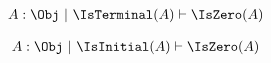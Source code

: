 \begin{sequent}
\begin{align*}
 A:\Obj ~|~ \IsTerminal( A ) \vdash \IsZero( A )
\end{align*}
\end{sequent}

\begin{sequent}
\begin{align*}
 A:\Obj ~|~ \IsInitial( A ) \vdash \IsZero( A )
\end{align*}
\end{sequent}

